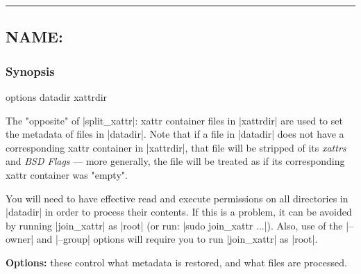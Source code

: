 \documentclass[11pt]{article}
\def\sepline{\begin{center}\rule{5in}{1pt}\end{center}}
\newcommand\BackSlash{\char92}
\newcommand\LeftBrace{\char123}
\newcommand\RightBrace{\char125}
\newenvironment{Quote}{\let\\\BackSlash\let\{\LeftBrace\let\}\RightBrace}{}
\begin{document}
\sepline

\subsection*{NAME: \tt{}}

\subsubsection*{Synopsis}

\begin{Quote}
\begin{Vrb}
    options datadir xattrdir
\end{Vrb}
\end{Quote}



The "opposite" of |split_xattr|:  
xattr container files in |xattrdir| are used to
set the metadata of files in |datadir|.  
Note that if a file in |datadir| does not
have a corresponding xattr container in |xattrdir|, 
that file will be stripped of its \emph{xattrs} and \emph{BSD Flags} ---
more generally, the file will be treated as if its
corresponding xattr container was "empty".


You will need to have effective read and execute permissions
on all directories in |datadir| in order to process their contents.
If this is a problem, it can be avoided by running |join_xattr| 
as |root| (or run: |sudo join_xattr ...|).
Also, use of the |--owner| and |--group| options will require
you to run |join_xattr| as |root|.



\medbreak
{\bf Options:} these control what metadata is restored,
and what files are processed.
\end{document}
